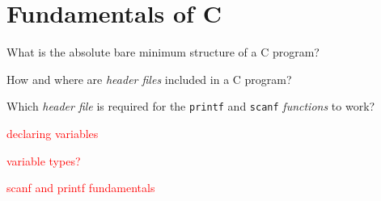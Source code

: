 \documentclass{pass}
\begin{document}
\section*{Fundamentals of C}
\begin{enumerate}[resume]
\item What is the absolute bare minimum structure of a C program?\\[20pt]
\item How and where are \textit{header files} included in a C program?\\[20pt]
\item Which \textit{header file} is required for the \texttt{printf} and \texttt{scanf} \textit{functions} to work?\\[20pt]
\textcolor{red}{\item declaring variables}

\textcolor{red}{\item variable types?}

\textcolor{red}{\item scanf and printf fundamentals}
\end{enumerate}
\end{document}
